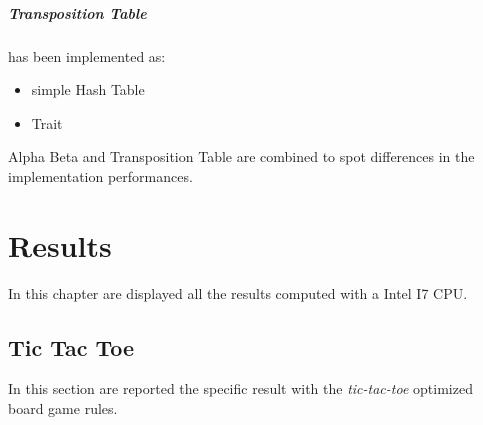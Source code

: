 \documentclass[]{report}
\begin{document}
\paragraph{Transposition Table} has been implemented as:
\begin{itemize}
	\item simple Hash Table
	\item Trait
\end{itemize}

Alpha Beta and Transposition Table are combined to spot differences in the implementation performances.

\chapter{Results}

In this chapter are displayed all the results computed with a Intel I7 CPU.

\section{Tic Tac Toe}
In this section are reported the specific result with the \textit{tic-tac-toe} optimized board game rules.
\end{document}

